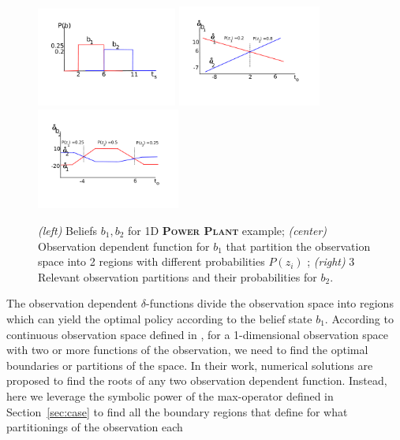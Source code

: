 \documentclass{article} %
\begin{document}
\begin{figure}[tbp!]
\centering
\hspace{-17mm}
\includegraphics[width=0.41\textwidth]{pics/beliefs.pdf}
\hspace{-12mm}
\includegraphics[width=0.42\textwidth]{pics/delta1.pdf}
\hspace{-12mm}
\includegraphics[width=0.42\textwidth]{pics/delta2.pdf}
\hspace{-17mm}
\vspace{-10mm}
\caption{\footnotesize 
{\it (left)} Beliefs $b_1,b_2$ for 1D \textsc{\bf Power Plant} example; 
{\it (center)} Observation dependent function for $b_1$ that partition the observation space into 2 regions with different probabilities $P(z_i)$ ; 
{\it (right)} 3 Relevant observation partitions and their probabilities for $b_2$.
}
\label{fig:beliefs}
\end{figure}
The observation dependent $\delta$-functions divide the observation space into regions which can yield the optimal policy according to the belief state $b_1$. According to continuous observation space defined in \cite{pascal_ijcai05}, for a 1-dimensional observation space with two or more functions of the observation, we need to find the optimal boundaries or partitions of the space. In their work, numerical solutions are proposed to find the roots of any two observation dependent function. Instead, here we leverage the symbolic power of the max-operator defined in Section~\ref{sec:case} to find all the boundary regions that define for what partitionings of the observation each 
\end{document}
